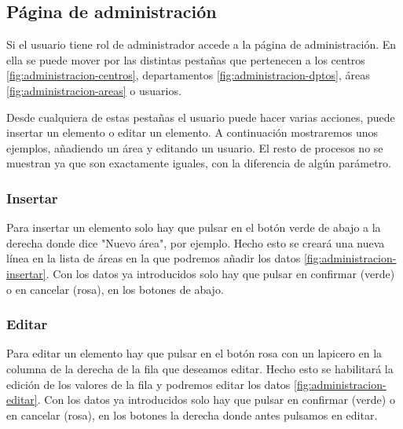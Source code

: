 
\subsection{Página de administración}

Si el usuario tiene rol de administrador accede a la página de administración. En ella se puede mover por las distintas pestañas que pertenecen a los centros \ref{fig:administracion-centros}, departamentos \ref{fig:administracion-dptos}, áreas \ref{fig:administracion-areas} o usuarios.


Desde cualquiera de estas pestañas el usuario puede hacer varias acciones, puede insertar un elemento o editar un elemento. A continuación mostraremos unos ejemplos, añadiendo un área y editando un usuario. El resto de procesos no se muestran ya que son exactamente iguales, con la diferencia de algún parámetro.

\subsubsection{Insertar}

Para insertar un elemento solo hay que pulsar en el botón verde de abajo a la derecha donde dice "Nuevo área", por ejemplo. Hecho esto se creará una nueva línea en la lista de áreas en la que podremos añadir los datos \ref{fig:administracion-insertar}. Con los datos ya introducidos solo hay que pulsar en confirmar (verde) o en cancelar (rosa), en los botones de abajo.


\subsubsection{Editar}

Para editar un elemento hay que pulsar en el botón rosa con un lapicero en la columna de la derecha de la fila que deseamos editar. Hecho esto se habilitará la edición de los valores de la fila y podremos editar los datos \ref{fig:administracion-editar}. Con los datos ya introducidos solo hay que pulsar en confirmar (verde) o en cancelar (rosa), en los botones la derecha donde antes pulsamos en editar.

